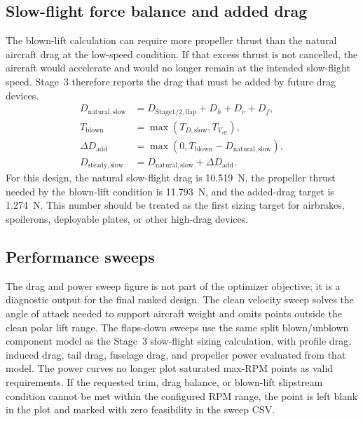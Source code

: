 \documentclass[11pt]{article}
\begin{document}
\subsection{Slow-flight force balance and added drag}
The blown-lift calculation can require more propeller thrust than the natural aircraft drag at the low-speed condition. If that excess thrust is not cancelled, the aircraft would accelerate and would no longer remain at the intended slow-flight speed. Stage~3 therefore reports the drag that must be added by future drag devices.
\begin{align}
D_{\mathrm{natural,slow}} &= D_{\mathrm{Stage1/2,flap}} + D_h + D_v + D_f, \\
T_{\mathrm{blown}} &= \max(T_{D,\mathrm{slow}}, T_{V_{\mathrm{eff}}}), \\
\Delta D_{\mathrm{add}} &= \max(0, T_{\mathrm{blown}} - D_{\mathrm{natural,slow}}), \\
D_{\mathrm{steady,slow}} &= D_{\mathrm{natural,slow}} + \Delta D_{\mathrm{add}}.
\end{align}
For this design, the natural slow-flight drag is \SI{10.519}{N}, the propeller thrust needed by the blown-lift condition is \SI{11.793}{N}, and the added-drag target is \SI{1.274}{N}. This number should be treated as the first sizing target for airbrakes, spoilerons, deployable plates, or other high-drag devices.

\subsection{Performance sweeps}
The drag and power sweep figure is not part of the optimizer objective; it is a diagnostic output for the final ranked design. The clean velocity sweep solves the angle of attack needed to support aircraft weight and omits points outside the clean polar lift range. The flaps-down sweeps use the same split blown/unblown component model as the Stage~3 slow-flight sizing calculation, with profile drag, induced drag, tail drag, fuselage drag, and propeller power evaluated from that model.
The power curves no longer plot saturated max-RPM points as valid requirements. If the requested trim, drag balance, or blown-lift slipstream condition cannot be met within the configured RPM range, the point is left blank in the plot and marked with zero feasibility in the sweep CSV.
\end{document}

